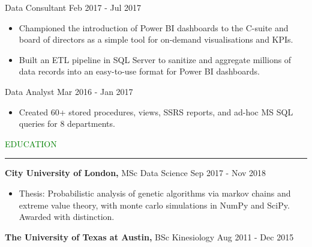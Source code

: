 \documentclass [
        11pt
] {article}
\begin{document}
\noindent Data Consultant
\hspace*{\fill} Feb 2017 - Jul 2017

\begin{itemize}[itemsep=1pt,topsep=1pt]
\renewcommand{\labelitemi}{\scriptsize$\blacksquare$}

\item Championed the introduction of Power BI dashboards to the C-suite
and board of directors as a simple tool for on-demand visualisations and KPIs.

\item Built an ETL pipeline in SQL Server to sanitize and aggregate
millions of data records into an easy-to-use format for Power BI dashboards.

\end{itemize}

\noindent Data Analyst
\hspace*{\fill} Mar 2016 - Jan 2017

\begin{itemize}[itemsep=1pt,topsep=1pt]
\renewcommand{\labelitemi}{\scriptsize$\blacksquare$}

\item Created 60+ stored procedures, views, SSRS reports, and ad-hoc
MS SQL queries for 8 departments.

\end{itemize}

\vspace*{10pt}


\noindent\textcolor{green}{EDUCATION \rule{16cm}{1pt}}

\vspace*{10pt}

\noindent \textbf {City University of London,} MSc Data Science
\hspace*{\fill} Sep 2017 - Nov 2018

\begin{itemize}[noitemsep,topsep=0pt]
\renewcommand{\labelitemi}{\scriptsize$\blacksquare$}
\item Thesis: Probabilistic analysis of genetic algorithms via markov chains
and extreme value theory, with monte carlo simulations in NumPy and SciPy.
Awarded with distinction.
\end{itemize}

\noindent \textbf {The University of Texas at Austin,} BSc Kinesiology
\hspace*{\fill} Aug 2011 - Dec 2015
\end{document}
